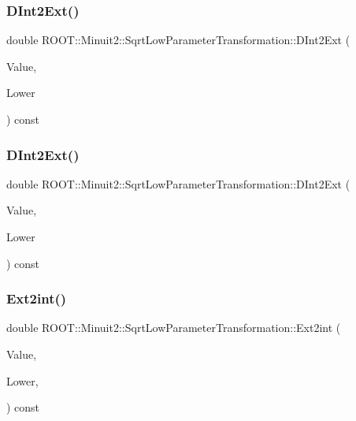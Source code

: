 \subsubsection{\texorpdfstring{DInt2Ext()}{DInt2Ext()}\hspace{0.1cm}{\footnotesize\ttfamily [2/3]}}
{\footnotesize\ttfamily double R\+O\+O\+T\+::\+Minuit2\+::\+Sqrt\+Low\+Parameter\+Transformation\+::\+D\+Int2\+Ext (\begin{DoxyParamCaption}\item[{double}]{Value,  }\item[{double}]{Lower }\end{DoxyParamCaption}) const}

\mbox{\label{classROOT_1_1Minuit2_1_1SqrtLowParameterTransformation_ade7d793a9299b15dc6e218a11efdb15e}} 
\subsubsection{\texorpdfstring{DInt2Ext()}{DInt2Ext()}\hspace{0.1cm}{\footnotesize\ttfamily [3/3]}}
{\footnotesize\ttfamily double R\+O\+O\+T\+::\+Minuit2\+::\+Sqrt\+Low\+Parameter\+Transformation\+::\+D\+Int2\+Ext (\begin{DoxyParamCaption}\item[{double}]{Value,  }\item[{double}]{Lower }\end{DoxyParamCaption}) const}

\mbox{\label{classROOT_1_1Minuit2_1_1SqrtLowParameterTransformation_a2035002e75f51cafc5e5d8afc05913e6}} 
\subsubsection{\texorpdfstring{Ext2int()}{Ext2int()}\hspace{0.1cm}{\footnotesize\ttfamily [1/3]}}
{\footnotesize\ttfamily double R\+O\+O\+T\+::\+Minuit2\+::\+Sqrt\+Low\+Parameter\+Transformation\+::\+Ext2int (\begin{DoxyParamCaption}\item[{double}]{Value,  }\item[{double}]{Lower,  }\item[{const \mbox{\hyperlink{classROOT_1_1Minuit2_1_1MnMachinePrecision}{Mn\+Machine\+Precision}} \&}]{ }\end{DoxyParamCaption}) const}

